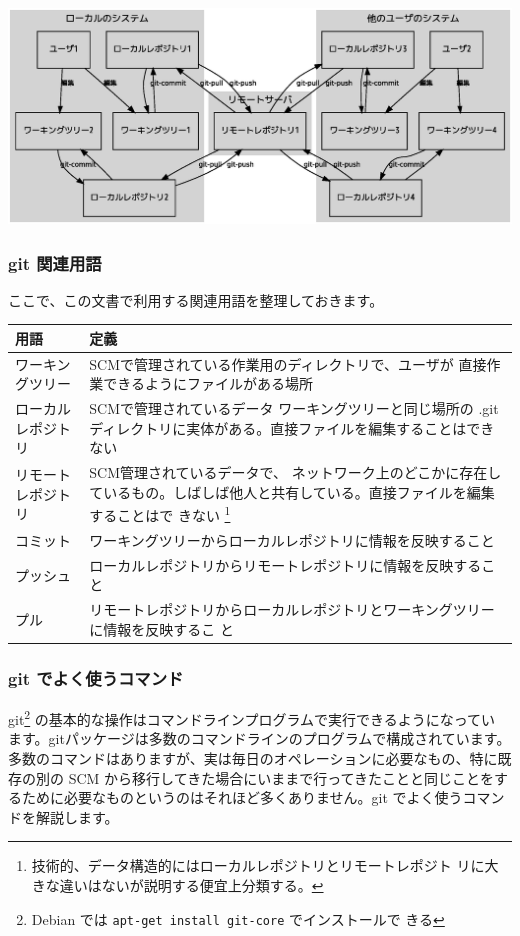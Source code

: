 \documentclass[mingoth,a4paper]{jsarticle}
\begin{document}
\includegraphics[width=0.8\hsize]{image200704/git-repos.eps}

\subsubsection{git 関連用語}

ここで、この文書で利用する関連用語を整理しておきます。

\begin{tabular}{|l|p{30em}|}
\hline
\hline
用語 & 定義 \\
\hline
 ワーキングツリー & SCMで管理されている作業用のディレクトリで、ユーザが
 直接作業できるようにファイルがある場所\\
\hline
 ローカルレポジトリ & SCMで管理されているデータ
 ワーキングツリーと同じ場所の
 .git ディレクトリに実体がある。直接ファイルを編集することはできない\\
\hline
 リモートレポジトリ & SCM管理されているデータで、
 ネットワーク上のどこかに存在し
 ているもの。しばしば他人と共有している。直接ファイルを編集することはで
 きない
 \footnote{技術的、データ構造的にはローカルレポジトリとリモートレポジト
 リに大きな違いはないが説明する便宜上分類する。}\\
\hline
 コミット & ワーキングツリーからローカルレポジトリに情報を反映すること\\
\hline
 プッシュ & ローカルレポジトリからリモートレポジトリに情報を反映するこ
 と\\
\hline
 プル & リモートレポジトリからローカルレポジトリとワーキングツリーに情報を反映するこ
 と\\
\hline
\hline
\end{tabular}
\subsubsection{git でよく使うコマンド}

git\footnote{Debian では {\tt apt-get install git-core} でインストールで
きる} の基本的な操作はコマンドラインプログラムで実行できるようになってい
ます。gitパッケージは多数のコマンドラインのプログラムで構成されています。
多数のコマンドはありますが、実は毎日のオペレーションに必要なもの、特に既
存の別の SCM から移行してきた場合にいままで行ってきたことと同じことをす
るために必要なものというのはそれほど多くありません。git でよく使うコマン
ドを解説します。
\end{document}
